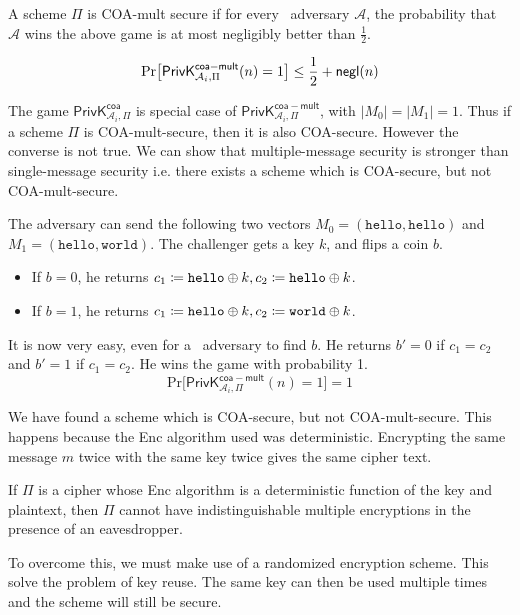 \documentclass[11pt]{article}
\begin{document}
A scheme \(\Pi\) is COA-mult secure if for every \ppt\ adversary \(\mathcal{A}\),
the probability that \(\mathcal{A}\) wins the above game is at most negligibly better than \(\frac{1}{2}\). 

\[  \mathrm{Pr} \big[ \mathsf{PrivK}^{\mathsf{coa-mult}}_{\mathcal{A}_i, \Pi} (n)  =  1  \big] \le \frac{1}{2}+ {\sf negl}(n)\]

The game \(\mathsf{PrivK}^{\mathsf{coa}}_{\mathcal{A}_i, \Pi}\) is special case of \(\mathsf{PrivK}^{\mathsf{coa-mult}}_{\mathcal{A}_i, \Pi}\), with \(|M_0| = |M_1| = 1\). Thus if a scheme \(\Pi\) is COA-mult-secure, then it is also COA-secure. However the converse is not true. We can show that multiple-message security is stronger than single-message security  i.e. there exists a scheme which is COA-secure, but not COA-mult-secure.

The adversary can send the following two vectors \(M_0 = (\texttt{hello}, \texttt{hello})\) and \(M_1 = (\texttt{hello}, \texttt{world})\). The challenger gets a key \(k\), and flips a coin \(b\). 
\begin{itemize}
    \item If \(b = 0\), he returns \(c_1 \coloneqq\texttt{hello} \oplus k, c_2 \coloneqq \texttt{hello} \oplus k\).
    \item If \(b = 1\), he returns \(c_1 \coloneqq \texttt{hello} \oplus k, c_2 \coloneqq \texttt{world} \oplus k\).
\end{itemize}

It is now very easy, even for a \ppt\ adversary to find \(b\). He returns \(b' = 0\) if \(c_1 = c_2\) and \(b' = 1\) if \(c_1 = c_2\). He wins the game with probability 1. 
\[  \mathrm{Pr} \big[ \mathsf{PrivK}^{\mathsf{coa-mult}}_{\mathcal{A}_i, \Pi} (n)  =  1  \big] = 1\]

We have found a scheme which is COA-secure, but not COA-mult-secure. This happens because the {\sf Enc} algorithm used was deterministic. Encrypting the same message \(m\) twice with the same key twice gives the same cipher text. 
\begin{theorem*}
    If \(\Pi\) is a cipher whose {\sf Enc} algorithm is a deterministic function of the key and plaintext, then \(\Pi\) cannot have indistinguishable multiple encryptions in the presence of an eavesdropper.
\end{theorem*}

To overcome this, we must make use of a randomized encryption scheme. This solve the problem of key reuse. The same key can then be used multiple times and the scheme will still be secure.  
\end{document}
